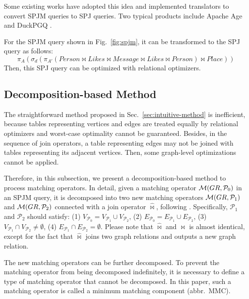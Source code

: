 Some existing works have adopted this idea and implemented translators to convert SPJM queries to SPJ queries.
Two typical products include Apache Age \cite{apache-age} and DuckPGQ \cite{DuckPGQ,DuckPGQ-VLDB}.

\begin{example}
    For the SPJM query shown in Fig.~\ref{fig:spjm}, it can be transformed to the SPJ query as follows:
    \begin{equation*}
        \pi_A(\sigma_d(\pi_{A'}(Person \Join Likes \Join Message \Join Likes \Join Person) \Join Place))
    \end{equation*}
    Then, this SPJ query can be optimized with relational optimizers.
\end{example}

\subsection{Decomposition-based Method}
The straightforward method proposed in Sec.~\ref{sec:intuitive-method} is inefficient, because tables representing vertices and edges are treated equally by relational optimizers and worst-case optimality cannot be guaranteed.
Besides, in the sequence of join operators, a table representing edges may not be joined with tables representing its adjacent vertices.
Then, some graph-level optimizations cannot be applied.

Therefore, in this subsection, we present a decomposition-based method to process matching operators.
In detail, given a matching operator $\mathcal{M}(GR, \mathcal{P}_0)$ in an SPJM query, it is decomposed into two new matching operators $\mathcal{M}(GR, \mathcal{P}_1)$ and $\mathcal{M}(GR, \mathcal{P}_2)$ connected with a join operator $\widehat{\Join}$, following \cite{huge}.
Specifically, $\mathcal{P}_1$ and $\mathcal{P}_2$ should satisfy: 
(1) $V_{\mathcal{P}_0} = V_{\mathcal{P}_1} \cup V_{\mathcal{P}_2}$,
(2) $E_{\mathcal{P}_0} = E_{\mathcal{P}_1} \cup E_{\mathcal{P}_2}$,
(3) $V_{\mathcal{P}_1} \cap V_{\mathcal{P}_2} \neq \emptyset$,
(4) $E_{\mathcal{P}_1} \cap E_{\mathcal{P}_2} = \emptyset$.
Please note that $\widehat{\Join}$ and $\Join$ is almost identical, except for the fact that $\widehat{\Join}$ joins two graph relations and outputs a new graph relation.

The new matching operators can be further decomposed.
To prevent the matching operator from being decomposed indefinitely, it is necessary to define a type of matching operator that cannot be decomposed.
In this paper, such a matching operator is called a minimum matching component (abbr.~MMC).

